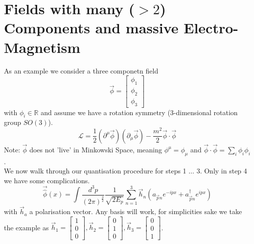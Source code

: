 \documentclass{report}
\begin{document}
\chapter{Fields with many ($>2$) Components and massive Electro-Magnetism}
As an example we consider a three componetn field \[
	\vec{\phi} = \begin{bmatrix} \phi_1 \\ \phi_2\\\phi_3 \end{bmatrix} 
	\] with $\phi_i \in \mathbb{R}$ and assume we have a rotation symmetry (3-dimensional rotation group $SO(3)$). \[
\mathcal{L} = \frac{1}{2} \left( \partial^\mu \vec{\phi}  \right) \left( \partial_\mu \vec{\phi}  \right) - \frac{m^2}{2} \vec{\phi} \cdot \vec{\phi}
\] Note: $\vec{\phi}$ does not 'live' in Minkowski Space, meaning $\phi^\mu = \phi_\mu $ and $\vec{\phi} \cdot \vec{\phi} = \sum_{i} \phi_i \phi_i$.\\
We now walk through our quantisation procedure for steps 1 $\ldots$ 3. Only in step 4 we have some complications.  \[
	\vec{\hat{\phi}}(x) = \int \frac{d^3p}{\left( 2 \pi \right)^{\frac{3}{2}}} \frac{1}{\sqrt{2 E_p} } \sum_{n=1}^{3} \vec{h}_n \left( a_{\vec{p}n} e^{-ipx} + a_{\vec{p}n}^\dagger e^{ipx} \right) 
\] with $\vec{h}_a$ a polarisation vector. Any basis will work, for simplicities sake we take the example as $\vec{h}_1 = \begin{bmatrix} 1 \\ 0 \\ 0 \end{bmatrix}, \vec{h}_2 = \begin{bmatrix} 0 \\ 1 \\ 0 \end{bmatrix} , \vec{h}_3 = \begin{bmatrix} 0\\0\\1 \end{bmatrix} $.\\
\end{document}
